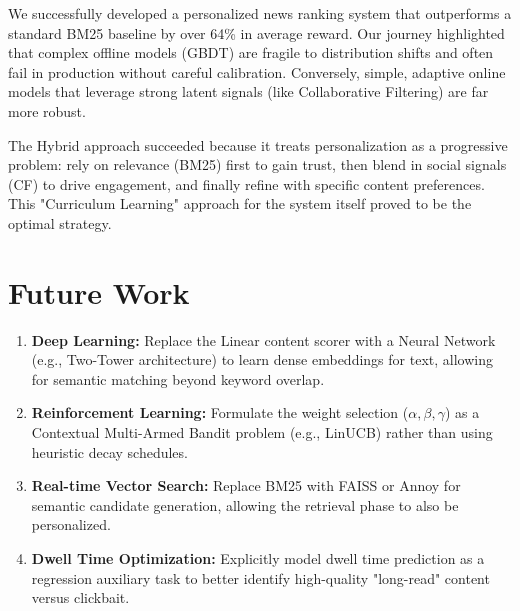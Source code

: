 \documentclass[11pt,a4paper]{article}
\begin{document}
We successfully developed a personalized news ranking system that outperforms a standard BM25 baseline by over 64\% in average reward. Our journey highlighted that complex offline models (GBDT) are fragile to distribution shifts and often fail in production without careful calibration. Conversely, simple, adaptive online models that leverage strong latent signals (like Collaborative Filtering) are far more robust.

The Hybrid approach succeeded because it treats personalization as a progressive problem: rely on relevance (BM25) first to gain trust, then blend in social signals (CF) to drive engagement, and finally refine with specific content preferences. This "Curriculum Learning" approach for the system itself proved to be the optimal strategy.

\section{Future Work}

\begin{enumerate}
    \item \textbf{Deep Learning:} Replace the Linear content scorer with a Neural Network (e.g., Two-Tower architecture) to learn dense embeddings for text, allowing for semantic matching beyond keyword overlap.
    \item \textbf{Reinforcement Learning:} Formulate the weight selection ($\alpha, \beta, \gamma$) as a Contextual Multi-Armed Bandit problem (e.g., LinUCB) rather than using heuristic decay schedules.
    \item \textbf{Real-time Vector Search:} Replace BM25 with FAISS or Annoy for semantic candidate generation, allowing the retrieval phase to also be personalized.
    \item \textbf{Dwell Time Optimization:} Explicitly model dwell time prediction as a regression auxiliary task to better identify high-quality "long-read" content versus clickbait.
\end{enumerate}
\end{document}
